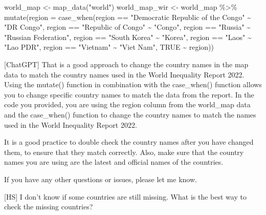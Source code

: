 \documentclass[
]{bxjsbook}
\newenvironment{Shaded}{\begin{snugshade}}{\end{snugshade}}
\newcommand{\AttributeTok}[1]{\textcolor[rgb]{0.77,0.63,0.00}{#1}}
\newcommand{\ConstantTok}[1]{\textcolor[rgb]{0.00,0.00,0.00}{#1}}
\newcommand{\FunctionTok}[1]{\textcolor[rgb]{0.00,0.00,0.00}{#1}}
\newcommand{\NormalTok}[1]{#1}
\newcommand{\OtherTok}[1]{\textcolor[rgb]{0.56,0.35,0.01}{#1}}
\newcommand{\SpecialCharTok}[1]{\textcolor[rgb]{0.00,0.00,0.00}{#1}}
\newcommand{\StringTok}[1]{\textcolor[rgb]{0.31,0.60,0.02}{#1}}
\theoremstyle{definition}
\theoremstyle{definition}
\theoremstyle{definition}
\theoremstyle{definition}
\theoremstyle{remark}
\begin{document}
\begin{Shaded}
\begin{Highlighting}[]
\NormalTok{world\_map }\OtherTok{\textless{}{-}} \FunctionTok{map\_data}\NormalTok{(}\StringTok{"world"}\NormalTok{)}
\NormalTok{world\_map\_wir }\OtherTok{\textless{}{-}}\NormalTok{ world\_map }\SpecialCharTok{\%\textgreater{}\%} 
  \FunctionTok{mutate}\NormalTok{(}\AttributeTok{region =} \FunctionTok{case\_when}\NormalTok{(region }\SpecialCharTok{==} \StringTok{"Democratic Republic of the Congo"} \SpecialCharTok{\textasciitilde{}} \StringTok{"DR Congo"}\NormalTok{,}
\NormalTok{                            region }\SpecialCharTok{==} \StringTok{"Republic of Congo"}  \SpecialCharTok{\textasciitilde{}} \StringTok{"Congo"}\NormalTok{,}
\NormalTok{                            region }\SpecialCharTok{==} \StringTok{"Russia"}  \SpecialCharTok{\textasciitilde{}} \StringTok{"Russian Federation"}\NormalTok{,}
\NormalTok{                            region }\SpecialCharTok{==} \StringTok{"South Korea"} \SpecialCharTok{\textasciitilde{}} \StringTok{"Korea"}\NormalTok{,}
\NormalTok{                            region }\SpecialCharTok{==} \StringTok{"Laos"} \SpecialCharTok{\textasciitilde{}}  \StringTok{"Lao PDR"}\NormalTok{,}
\NormalTok{                            region }\SpecialCharTok{==} \StringTok{"Vietnam"} \SpecialCharTok{\textasciitilde{}} \StringTok{"Viet Nam"}\NormalTok{,}
                            \ConstantTok{TRUE} \SpecialCharTok{\textasciitilde{}}\NormalTok{ region))}
\end{Highlighting}
\end{Shaded}

{[}ChatGPT{]} That is a good approach to change the country names in the map data to match the country names used in the World Inequality Report 2022. Using the mutate() function in combination with the case\_when() function allows you to change specific country names to match the data from the report. In the code you provided, you are using the region column from the world\_map data and the case\_when() function to change the country names to match the names used in the World Inequality Report 2022.

It is a good practice to double check the country names after you have changed them, to ensure that they match correctly. Also, make sure that the country names you are using are the latest and official names of the countries.

If you have any other questions or issues, please let me know.

{[}HS{]} I don't know if some countries are still missing. What is the best way to check the missing countries?
\end{document}
